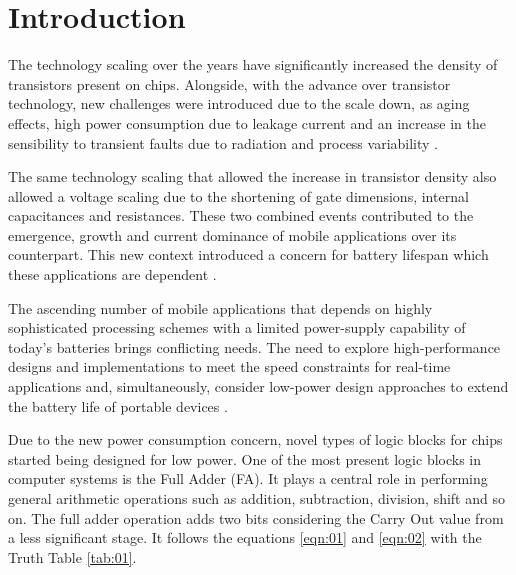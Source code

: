 \documentclass[ecp,tc, english]{iiufrgs}
\begin{document}

\listoffigures

\listoftables

\tableofcontents


\chapter{Introduction}
The technology scaling over the years have significantly increased the density of transistors present on chips. Alongside, with the advance over transistor technology, new challenges were introduced due to the scale down, as aging effects, high power consumption due to leakage current and an increase in the sensibility to transient faults due to radiation and process variability \cite{abbas:15}.

The same technology scaling that allowed the increase in transistor density also allowed a voltage scaling due to the shortening of gate dimensions, internal capacitances and resistances. These two combined events contributed to the emergence, growth and current dominance of mobile applications over its counterpart. This new context introduced a concern for battery lifespan which these applications are dependent \cite{islam:10}. 

The ascending number of mobile applications that depends on highly sophisticated processing schemes with a limited power-supply capability of today’s batteries brings conflicting needs. The need to explore high-performance designs and implementations to meet the speed constraints for real-time applications and, simultaneously, consider low-power design approaches to extend the battery life of portable devices \cite{shoarinejad:03}. 

Due to the new power consumption concern, novel types of logic blocks for chips started being designed for low power. One of the most present logic blocks in computer systems is the Full Adder (FA). It plays a central role in performing general arithmetic operations such as addition, subtraction, division, shift and so on. The full adder operation adds two bits considering the Carry Out value from a less significant stage. It follows the equations \ref{eqn:01} and \ref{eqn:02} with the Truth Table \ref{tab:01}.
\end{document}
